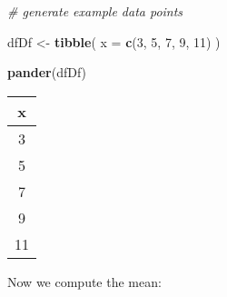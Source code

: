 \documentclass[]{book}
\newenvironment{Shaded}{\begin{snugshade}}{\end{snugshade}}
\newcommand{\KeywordTok}[1]{\textcolor[rgb]{0.13,0.29,0.53}{\textbf{#1}}}
\newcommand{\DataTypeTok}[1]{\textcolor[rgb]{0.13,0.29,0.53}{#1}}
\newcommand{\DecValTok}[1]{\textcolor[rgb]{0.00,0.00,0.81}{#1}}
\newcommand{\StringTok}[1]{\textcolor[rgb]{0.31,0.60,0.02}{#1}}
\newcommand{\CommentTok}[1]{\textcolor[rgb]{0.56,0.35,0.01}{\textit{#1}}}
\newcommand{\OperatorTok}[1]{\textcolor[rgb]{0.81,0.36,0.00}{\textbf{#1}}}
\newcommand{\NormalTok}[1]{#1}
\theoremstyle{definition}
\theoremstyle{definition}
\theoremstyle{definition}
\theoremstyle{remark}
\begin{document}
\begin{Shaded}
\begin{Highlighting}[]
\CommentTok{# generate example data points}

\NormalTok{dfDf <-}\StringTok{ }
\StringTok{  }\KeywordTok{tibble}\NormalTok{(}
    \DataTypeTok{x =} \KeywordTok{c}\NormalTok{(}\DecValTok{3}\NormalTok{, }\DecValTok{5}\NormalTok{, }\DecValTok{7}\NormalTok{, }\DecValTok{9}\NormalTok{, }\DecValTok{11}\NormalTok{)}
\NormalTok{  )}

\KeywordTok{pander}\NormalTok{(dfDf)}
\end{Highlighting}
\end{Shaded}

\begin{longtable}[]{@{}c@{}}
\toprule
\begin{minipage}[b]{0.05\columnwidth}\centering\strut
x\strut
\end{minipage}\tabularnewline
\midrule
\endhead
\begin{minipage}[t]{0.05\columnwidth}\centering\strut
3\strut
\end{minipage}\tabularnewline
\begin{minipage}[t]{0.05\columnwidth}\centering\strut
5\strut
\end{minipage}\tabularnewline
\begin{minipage}[t]{0.05\columnwidth}\centering\strut
7\strut
\end{minipage}\tabularnewline
\begin{minipage}[t]{0.05\columnwidth}\centering\strut
9\strut
\end{minipage}\tabularnewline
\begin{minipage}[t]{0.05\columnwidth}\centering\strut
11\strut
\end{minipage}\tabularnewline
\bottomrule
\end{longtable}

Now we compute the mean:

\begin{Shaded}
\end{Shaded}
\end{document}

